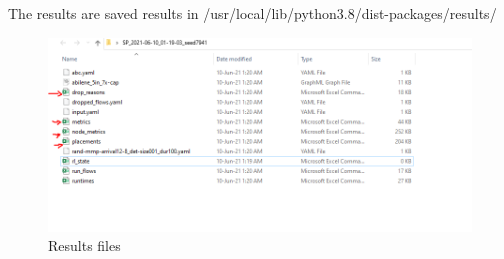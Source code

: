 The results are saved results in /usr/local/lib/python3.8/dist-packages/results/


\begin{figure}[h]
    \centering
    \includegraphics[width=1\textwidth]{results_folder}
    \caption{Results files}
    \label{fig:results_folder}
\end{figure}
